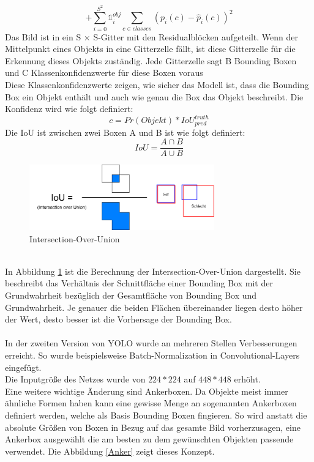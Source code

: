 \documentclass[conference]{IEEEtran}
\begin{document}
	\[ + \sum_{i=0}^{S^2} \mathbb{1}_{i}^{obj} \sum_{c \in classes} (p_i(c) - \hat{p}_i(c))^2 \]
	Das Bild ist in ein S × S-Gitter mit den Residualblöcken aufgeteilt. Wenn der Mittelpunkt eines Objekts in eine Gitterzelle fällt, ist diese Gitterzelle für die Erkennung dieses Objekts zuständig. Jede Gitterzelle sagt B Bounding Boxen und C Klassenkonfidenzwerte für diese Boxen voraus \cite{b1}\\
	Diese Klassenkonfidenzwerte zeigen, wie sicher das Modell ist, dass die Bounding Box ein Objekt enthält und auch wie genau die Box das Objekt beschreibt. Die Konfidenz wird wie folgt definiert:
	\[ c = Pr(Objekt) * IoU_{pred}^{truth} \]
	Die IoU ist zwischen zwei Boxen A und B ist wie folgt definiert:
	\[ IoU = \frac{A \cap B}{A \cup B} \]
	\begin{figure}[h]
		\begin{center}
			\includegraphics[width=8cm]{Media/Iou.png}
			\caption{Intersection-Over-Union}
			\label{IoU}
		\end{center}
	\end{figure}\\
	In Abbildung \ref{IoU} ist die Berechnung der Intersection-Over-Union dargestellt. Sie beschreibt das Verhältnis der Schnittfläche einer Bounding Box mit der Grundwahrheit bezüglich der Gesamtfläche von Bounding Box und Grundwahrheit. Je genauer die beiden Flächen übereinander liegen desto höher der Wert, desto besser ist die Vorhersage der Bounding Box.\\
	\\
	In der zweiten Version von YOLO \cite{b3} wurde an mehreren Stellen Verbesserungen erreicht. So wurde beispielsweise Batch-Normalization in Convolutional-Layers eingefügt.\\
	Die Inputgröße des Netzes wurde von $224*224$ auf $448*448$ erhöht.\\
	Eine weitere wichtige Änderung sind Ankerboxen. Da Objekte meist immer ähnliche Formen haben kann eine gewisse Menge an sogenannten Ankerboxen definiert werden, welche als Basis Bounding Boxen fingieren. So wird anstatt die absolute Größen von Boxen in Bezug auf das gesamte Bild vorherzusagen, eine Ankerbox ausgewählt die am besten zu dem gewünschten Objekten passende verwendet. Die Abbildung \ref{Anker} zeigt dieses Konzept.
\end{document}
